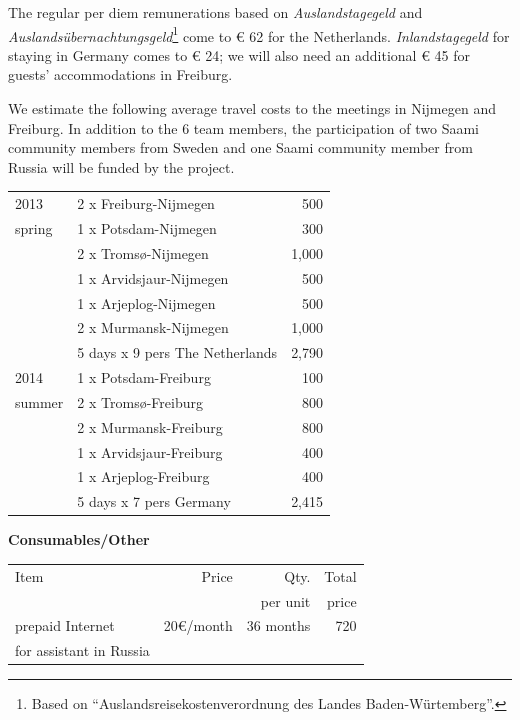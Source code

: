 \documentclass[a4paper,12pt]{article}
\begin{document}
{{\noindent The regular per diem remunerations based on \textit{Auslandstagegeld} and \textit{Auslandsübernachtungsgeld}\footnote{Based on “Auslandsreisekostenverordnung des Landes Baden-Würtemberg”.} come to € 62 for the Netherlands. \textit{Inlandstagegeld} for staying in Germany comes to € 24; we will also need an additional € 45 for guests' accommodations in Freiburg.
 
We estimate the following average travel costs to the meetings in Nijmegen and Freiburg. In addition to the 6 team members, the participation of two Saami community members from Sweden and one Saami community member from Russia will be funded by the project.
 
\begin{longtable}{| l | l | r |}
\hline
\hline
2013		& 2 x Freiburg-Nijmegen&500\\
spring	& 1 x Potsdam-Nijmegen&300\\
		& 2 x Tromsø-Nijmegen&1,000\\
		& 1 x Arvidsjaur-Nijmegen&500\\
		& 1 x Arjeplog-Nijmegen&500\\
		& 2 x Murmansk-Nijmegen&1,000\\
		& 5 days x 9 pers The Netherlands&2,790\\
\hline
2014		& 1 x Potsdam-Freiburg&100\\
summer	& 2 x Tromsø-Freiburg&800\\
		& 2 x Murmansk-Freiburg&800\\
		& 1 x Arvidsjaur-Freiburg&400\\
		& 1 x Arjeplog-Freiburg&400\\
		& 5 days x 7 pers Germany&2,415\\
\hline
\end{longtable}

\noindent \textbf{Consumables/Other}
\begin{longtable}{| l |  r | r | r |}
\hline
Item	&Price	&Qty.		&Total\\
	&	&per unit	&price\\
\hline		
prepaid Internet&20€/month&36 months&720\\
for assistant in Russia&&&\\
\hline
\end{longtable}

}}
\end{document}
